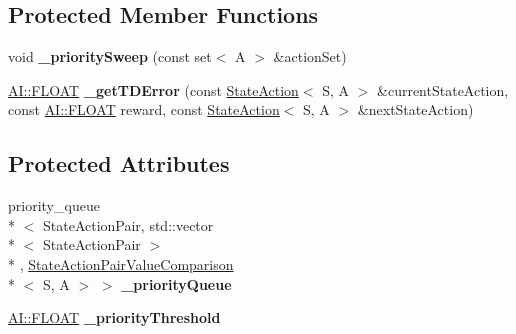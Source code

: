 \subsection*{Protected Member Functions}
\begin{DoxyCompactItemize}
\item 
\hypertarget{classAI_1_1Algorithm_1_1DynaQPrioritizeSweeping_a328421d2cc8ad26641b7786a5ca8b640}{void {\bfseries \+\_\+priority\+Sweep} (const set$<$ A $>$ \&action\+Set)}\label{classAI_1_1Algorithm_1_1DynaQPrioritizeSweeping_a328421d2cc8ad26641b7786a5ca8b640}

\item 
\hypertarget{classAI_1_1Algorithm_1_1DynaQPrioritizeSweeping_a9f69f4ed43b2d9bdb446241fffbb20d7}{\hyperlink{namespaceAI_a41b74884a20833db653dded3918e05c3}{A\+I\+::\+F\+L\+O\+A\+T} {\bfseries \+\_\+get\+T\+D\+Error} (const \hyperlink{classAI_1_1StateAction}{State\+Action}$<$ S, A $>$ \&current\+State\+Action, const \hyperlink{namespaceAI_a41b74884a20833db653dded3918e05c3}{A\+I\+::\+F\+L\+O\+A\+T} reward, const \hyperlink{classAI_1_1StateAction}{State\+Action}$<$ S, A $>$ \&next\+State\+Action)}\label{classAI_1_1Algorithm_1_1DynaQPrioritizeSweeping_a9f69f4ed43b2d9bdb446241fffbb20d7}

\end{DoxyCompactItemize}
\subsection*{Protected Attributes}
\begin{DoxyCompactItemize}
\item 
\hypertarget{classAI_1_1Algorithm_1_1DynaQPrioritizeSweeping_aceb5ef5c47db0d322b4e03ec2c457d1a}{priority\+\_\+queue\\*
$<$ State\+Action\+Pair, std\+::vector\\*
$<$ State\+Action\+Pair $>$\\*
, \hyperlink{classAI_1_1StateActionPairValueComparison}{State\+Action\+Pair\+Value\+Comparison}\\*
$<$ S, A $>$ $>$ {\bfseries \+\_\+priority\+Queue}}\label{classAI_1_1Algorithm_1_1DynaQPrioritizeSweeping_aceb5ef5c47db0d322b4e03ec2c457d1a}

\item 
\hypertarget{classAI_1_1Algorithm_1_1DynaQPrioritizeSweeping_adc3809217aba2de41fbea2b9fb9e5648}{\hyperlink{namespaceAI_a41b74884a20833db653dded3918e05c3}{A\+I\+::\+F\+L\+O\+A\+T} {\bfseries \+\_\+priority\+Threshold}}\label{classAI_1_1Algorithm_1_1DynaQPrioritizeSweeping_adc3809217aba2de41fbea2b9fb9e5648}

\end{DoxyCompactItemize}
